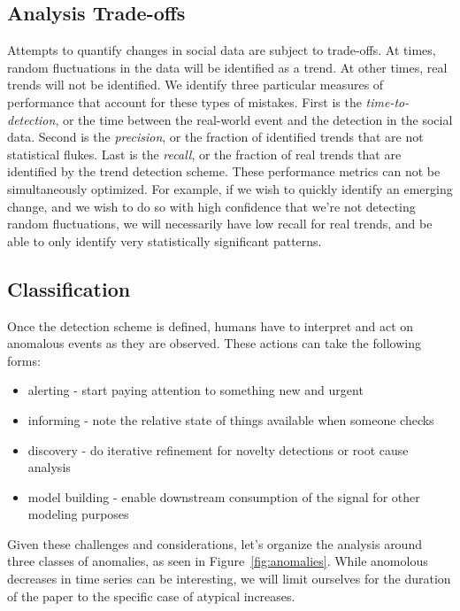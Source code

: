 \documentclass{article}
\begin{document}
\subsection{Analysis Trade-offs}
Attempts to quantify changes in social data are subject to trade-offs. 
At times, random fluctuations in the data will be identified as a trend.
At other times, real trends will not be identified. We identify three 
particular measures of performance that account for these types of mistakes.
First is the \textit{time-to-detection}, or the time between the
real-world event and the detection in the social data. 
Second is the \textit{precision}, or the fraction of identified trends 
that are not statistical flukes. 
Last is the \textit{recall}, or the fraction of real trends that are identified
by the trend detection scheme.
These performance metrics can not be simultaneously optimized.
For example, if we wish to quickly identify an
emerging change, and we wish to do so with high confidence that we’re not
detecting random fluctuations, we will necessarily have 
low recall for real trends, and be 
able to only identify very statistically significant patterns.

\subsection{Classification}
Once the detection scheme is defined, humans have to interpret
and act on anomalous events as they are observed. These actions can take the
following forms:

\begin{itemize} 
    \item alerting - start paying attention to something new and urgent 
    \item informing - note the relative state of things available when someone 
        checks 
    \item discovery - do iterative refinement for novelty detections or root 
        cause analysis 
    \item model building - enable downstream consumption of the signal for 
        other modeling purposes 
\end{itemize}

Given these challenges and considerations, let’s organize the analysis around
three classes of anomalies, as seen in Figure~\ref{fig:anomalies}. While
anomolous decreases in time series can be interesting, we will limit ourselves
for the duration of the paper to the specific case of atypical increases.
\end{document}
